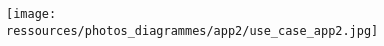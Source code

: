\documentclass[../rapport.tex]{subfiles}
\begin{document}
	\begin{figure}[h!]
		\centering \texttt{[image: ressources/photos\_diagrammes/app2/use\_case\_app2.jpg]}
	\end{figure}
\end{document}

